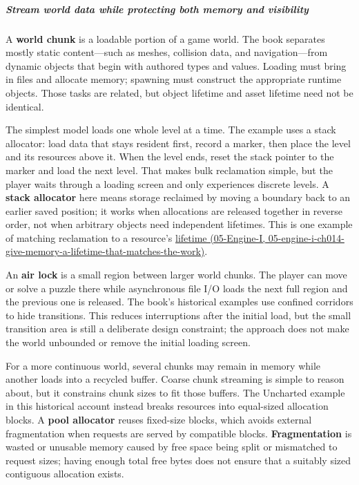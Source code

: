 \subparagraph{Stream world data while protecting both memory and visibility}\label{06-engine-ii-ch032-stream-world-data-while-protecting-both-memory-and-visibility}

A \textbf{world chunk} is a loadable portion of a game world. The book separates mostly static content---such as meshes, collision data, and navigation---from dynamic objects that begin with authored types and values. Loading must bring in files and allocate memory; spawning must construct the appropriate runtime objects. Those tasks are related, but object lifetime and asset lifetime need not be identical.

The simplest model loads one whole level at a time. The example uses a stack allocator: load data that stays resident first, record a marker, then place the level and its resources above it. When the level ends, reset the stack pointer to the marker and load the next level. That makes bulk reclamation simple, but the player waits through a loading screen and only experiences discrete levels. A \textbf{stack allocator} here means storage reclaimed by moving a boundary back to an earlier saved position; it works when allocations are released together in reverse order, not when arbitrary objects need independent lifetimes. This is one example of matching reclamation to a resource's \href{../05-Engine-I/main.pdf\#nameddest=05-engine-i-ch014-give-memory-a-lifetime-that-matches-the-work}{lifetime (05-Engine-I, 05-engine-i-ch014-give-memory-a-lifetime-that-matches-the-work)}.

An \textbf{air lock} is a small region between larger world chunks. The player can move or solve a puzzle there while asynchronous file I/O loads the next full region and the previous one is released. The book's historical examples use confined corridors to hide transitions. This reduces interruptions after the initial load, but the small transition area is still a deliberate design constraint; the approach does not make the world unbounded or remove the initial loading screen.

For a more continuous world, several chunks may remain in memory while another loads into a recycled buffer. Coarse chunk streaming is simple to reason about, but it constrains chunk sizes to fit those buffers. The Uncharted example in this historical account instead breaks resources into equal-sized allocation blocks. A \textbf{pool allocator} reuses fixed-size blocks, which avoids external fragmentation when requests are served by compatible blocks. \textbf{Fragmentation} is wasted or unusable memory caused by free space being split or mismatched to request sizes; having enough total free bytes does not ensure that a suitably sized contiguous allocation exists.

